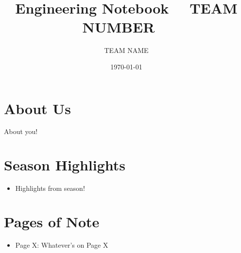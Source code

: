 \title{Engineering Notebook ~~TEAM NUMBER~~}
\author{~~TEAM NAME~~}
\date{\monthyeardate\today}
\maketitle

\section*{About Us}

About you!

\section*{Season Highlights}
\begin{itemize}
  \item Highlights from season!
\end{itemize}

\section*{Pages of Note}
\begin{itemize}
    \item Page X: Whatever's on Page X
\end{itemize}
